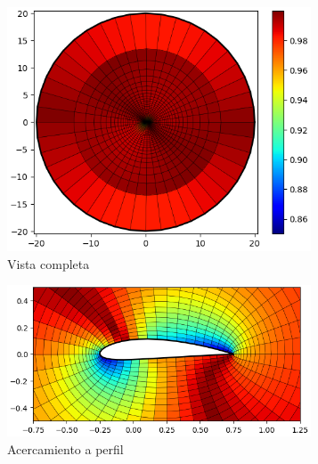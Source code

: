 \documentclass[letterpaper, openright, 12pt]{book}
\begin{document}
    \begin{figure}[htbp!]
        \centering
        \begin{subfigure}[c]{0.48\textwidth}
            \includegraphics[keepaspectratio,
                width=0.99\textwidth]{./img/naca4415_skew_far}
            \caption{Vista completa}
            \label{fig:naca4415_skew_far}
        \end{subfigure}
        \hfill
        \begin{subfigure}[c]{0.48\textwidth}
            \includegraphics[keepaspectratio,
                width=0.99\textwidth]{./img/naca4415_skew_close}
            \caption{Acercamiento a perfil}
            \label{fig:naca4415_skew_close}
        \end{subfigure}
        \begin{subfigure}[c]{0.48\textwidth}

\end{subfigure}
\end{figure}
\end{document}
